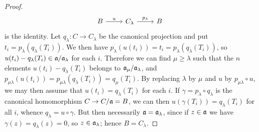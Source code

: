 \begin{proof}
\[\begin{tikzcd}
B\ar[r,"u"]&C_\lambda\ar[r,"p_\lambda"]&B
\end{tikzcd}\]
is the identity. Let $q_\lambda:C\to C_\lambda$ be the canonical projection and put $t_i=p_\lambda(q_\lambda(T_i))$. We then have $p_\lambda(u(t_i))=t_i=p_\lambda(q_\lambda(T_i))$, so $u(t_i)-q_\lambda(T_i)\in\mathfrak{a}/\mathfrak{a}_\lambda$ for each $i$. Therefore we can find $\mu\geq\lambda$ such that the $n$ elements $u(t_i)-q_\lambda(T_i)$ belongs to $\mathfrak{a}_\mu/\mathfrak{a}_\lambda$, and $p_{\mu\lambda}(u(t_i))=p_{\mu\lambda}(q_\lambda(T_i))=q_\mu(T_i)$. By replacing $\lambda$ by $\mu$ and $u$ by $p_{\mu\lambda}\circ u$, we may then assume that $u(t_i)=q_\lambda(T_i)$ for each $i$. If $\gamma=p_\lambda\circ q_\lambda$ is the canonical homomorphism $C\to C/\mathfrak{a}=B$, we can then $u(\gamma(T_i))=q_\lambda(T_i)$ for all $i$, whence $q_\lambda=u\circ\gamma$. But then necessarily $\mathfrak{a}=\mathfrak{a}_\lambda$, since if $z\in\mathfrak{a}$ we have $\gamma(z)=q_\lambda(z)=0$, so $z\in\mathfrak{a}_\lambda$; hence $B=C_\lambda$. 
\end{proof}

